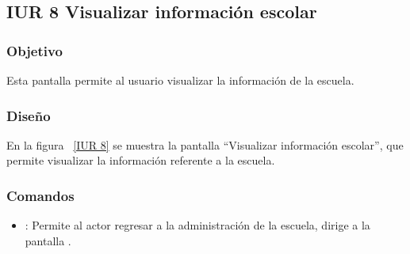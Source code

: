 \subsection{IUR 8 Visualizar información escolar}

\subsubsection{Objetivo}
	
     Esta pantalla permite al usuario  visualizar la información de la escuela.

\subsubsection{Diseño}

    
    En la figura ~\ref{IUR 8} se muestra la pantalla ``Visualizar información escolar'', que permite visualizar la información referente a la escuela.
    
    

    
\subsubsection{Comandos}
    \begin{itemize}
   \item {}: Permite al actor regresar a la administración de la escuela, dirige a la pantalla .
    \end{itemize}
 
